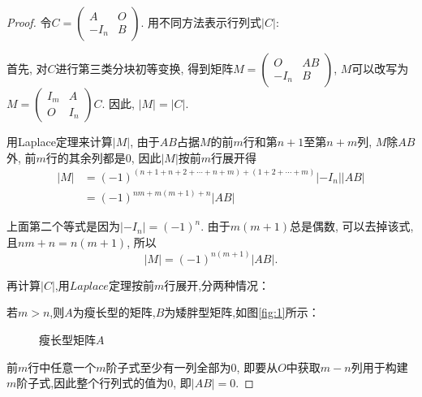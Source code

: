 \begin{proof}
  令$C=\left(\begin{smallmatrix}
      A & O\\
      -I_n & B \end{smallmatrix}\right)$.
  用不同方法表示行列式$|C|$:

  首先, 对$C$进行第三类分块初等变换, 得到矩阵$M=\left(\begin{smallmatrix}
      O & AB\\
      -I_n & B \end{smallmatrix}\right)$, $M$可以改写为
  $M = \left(\begin{smallmatrix}
      I_m & A\\
      O & I_n \end{smallmatrix}\right)C$. 
  因此, $|M| = |C|$. 

  用Laplace定理来计算$\left\vert M \right\vert$, 
  由于$AB$占据$M$的前$m$行和第$n+1$至第$n+m$列, 
  $M$除$AB$外, 前$m$行的其余列都是$0$, 因此$|M|$按前$m$行展开得
  \begin{align*}
    |M| & =(-1)^{(n+1+n+2+\cdots+n+m)+(1+2+\cdots+m)}|-I_n||AB|\\
        & =(-1)^{nm+m(m+1)+n}|AB|
  \end{align*}
  
  上面第二个等式是因为$|-I_n|=(-1)^n$. 
  由于$m(m+1)$总是偶数, 可以去掉该式, 且$nm+n=n(m+1)$, 所以
  \begin{equation}\label{eq:5}
    |M|=(-1)^{n(m+1)}|AB|.
  \end{equation}  

  再计算$|C|$,用$Laplace$定理按前$m$行展开,分两种情况：

  若$m > n$,则$A$为瘦长型的矩阵,$B$为矮胖型矩阵,如图\eqref{fig:1}所示：\\
  \begin{figure}[!ht]
   \begin{center}
  \end{center}
  \caption{瘦长型矩阵$A$\label{fig:1}}
\end{figure}  前$m$行中任意一个$m$阶子式至少有一列全部为$0$,
即要从$O$中获取$m-n$列用于构建$m$阶子式,因此整个行列式的值为$0$,
即$|AB|=0$.


\end{proof}

